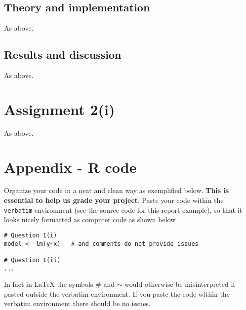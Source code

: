 \documentclass[11pt, a4paper]{article}
\begin{document}
\subsection{Theory and implementation}
As above.
\subsection{Results and discussion}
As above.

\section{Assignment 2(i)}
As above.

\newpage  %

\appendix  %

\section*{Appendix - R code}

Organize your code in a neat and clean way as exemplified below. \textbf{This is essential to help us grade your project}.
Paste your code within the \texttt{verbatim} environment (see the source code for this report example), so that it looks nicely formatted as computer code as shown below
\begin{verbatim}
# Question 1(i)
model <- lm(y~x)   # and comments do not provide issues

# Question 1(ii)
...
\end{verbatim}
In fact in {\LaTeX} the symbols \# and $\sim$ would otherwise be misinterpreted if pasted outside the verbatim environment. If you paste the code within the verbatim environment there should be no issues.
\end{document}
